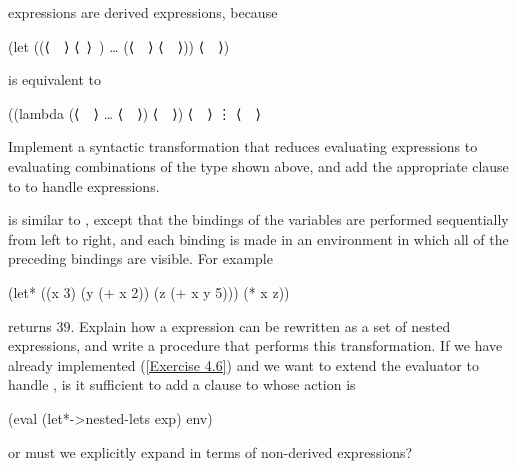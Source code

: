 \begin{exercise}
	\label{Exercise 4.6}
	 expressions are derived expressions, because
	\begin{scheme}
	  (let ((⟨~~⟩ ⟨~⟩~) … (⟨~~⟩ ⟨~~⟩))
	    ⟨~~⟩)
	\end{scheme}
	is equivalent to
	\begin{scheme}
	  ((lambda (⟨~~⟩ … ⟨~~⟩)
	     ⟨~~⟩)
	     ⟨~~⟩
	     ⋮
	     ⟨~~⟩
	\end{scheme}
	Implement a syntactic transformation  that reduces evaluating  expressions to evaluating combinations of the type shown above, and add the appropriate clause to  to handle  expressions.
\end{exercise}



\begin{exercise}
	\label{Exercise 4.7}
	 is similar to , except that the bindings of the  variables are performed sequentially from left to right, and each binding is made in an environment in which all of the preceding bindings are visible.
	For example
	\begin{scheme}
	  (let* ((x 3)  (y (+ x 2))  (z (+ x y 5)))
	    (* x z))
	\end{scheme}
	returns \( 39 \).
	Explain how a  expression can be rewritten as a set of nested  expressions, and write a procedure  that performs this transformation.
	If we have already implemented  (\cref{Exercise 4.6}) and we want to extend the evaluator to handle , is it sufficient to add a clause to  whose action is
	\begin{scheme}
	  (eval (let*->nested-lets exp) env)
	\end{scheme}
	or must we explicitly expand  in terms of non-derived expressions?
\end{exercise}



